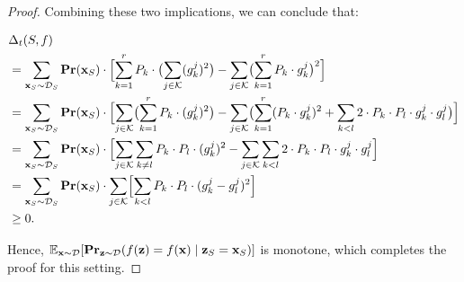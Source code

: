 \documentclass{article}
\newcommand{\z}{\textbf{z}}
\newcommand{\x}{\textbf{x}}
\newcommand{\fml}[1]{{\mathcal{#1}}}
\newcommand{\mbf}[1]{\ensuremath\mathbf{#1}}
\newcommand{\mbb}[1]{\ensuremath\mathbb{#1}}
\begin{document}
\begin{proof}
Combining these two implications, we can conclude that:

\begin{equation} \label{eq:gbx06}
\begin{aligned}
&\Delta_{t}(S,f) \\
&= \sum_{\x_{S}\sim \fml{D}_{S}} \mbf{Pr}(\x_{S}) \cdot
\Bigl[\sum^{r}_{k=1} P_{k} \cdot \bigl(\sum_{j \in \fml{K}} (g_{k}^{j})^2\bigr) - \sum_{j \in \fml{K}} \bigl(\sum^{r}_{k=1} P_{k} \cdot g_{k}^{j}\bigr)^2 \Bigr] \\
&= \sum_{\x_{S}\sim \fml{D}_{S}} \mbf{Pr}(\x_{S}) \cdot
\Bigl[\sum_{j \in \fml{K}} \bigl(\sum^{r}_{k=1} P_{k} \cdot (g_{k}^{j})^2\bigr) - \sum_{j \in \fml{K}} \bigl(\sum^{r}_{k=1} (P_{k} \cdot g_{k}^{j})^2
+ \sum_{k < l} 2 \cdot P_{k} \cdot P_{l} \cdot g_{k}^{j} \cdot g_{l}^{j}\bigr) \Bigr] \\
&= \sum_{\x_{S}\sim \fml{D}_{S}} \mbf{Pr}(\x_{S}) \cdot
\Bigl[\sum_{j \in \fml{K}} \sum_{k \neq l} P_{k} \cdot P_{l} \cdot (g_{k}^{j})^2 - \sum_{j \in \fml{K}} \sum_{k < l} 2 \cdot P_{k} \cdot P_{l} \cdot g_{k}^{j} \cdot g_{l}^{j} \Bigr] \\
&= \sum_{\x_{S}\sim \fml{D}_{S}} \mbf{Pr}(\x_{S}) \cdot \sum_{j \in \fml{K}} 
\Bigl[\sum_{k < l} P_{k} \cdot P_{l} \cdot  (g_{k}^{j} - g_{l}^{j})^2\Bigr] \\
&\ge 0.
\end{aligned}
\end{equation}
%

Hence, $\mbb{E}_{\x\sim \mathcal{D}}[\mbf{Pr}_{\z\sim \mathcal{D}}(f(\z) = f(\x) \mid \z_{S} = \x_{S})]$ is monotone, which completes the proof for this setting.

\end{proof}
\end{document}
